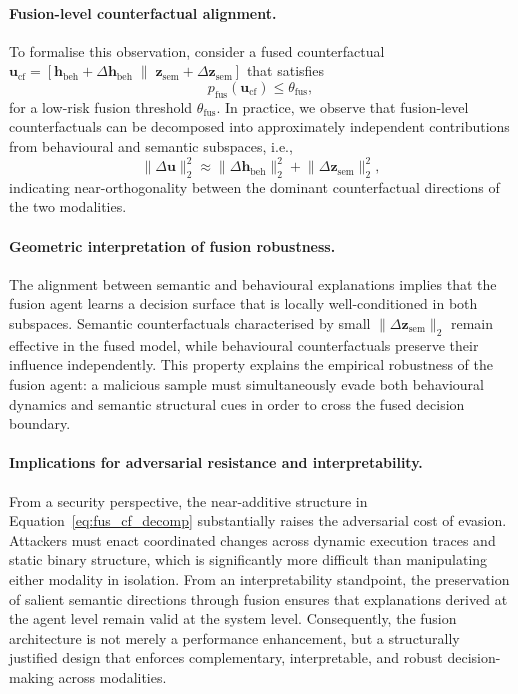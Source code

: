 \documentclass[lettersize,journal]{IEEEtran}
\begin{document}
\paragraph{Fusion-level counterfactual alignment.}
To formalise this observation, consider a fused counterfactual
$\mathbf{u}_{\mathrm{cf}} = [\mathbf{h}_{\mathrm{beh}} + \Delta \mathbf{h}_{\mathrm{beh}}
\;\|\; \mathbf{z}_{\mathrm{sem}} + \Delta \mathbf{z}_{\mathrm{sem}}]$
that satisfies
\begin{equation}
p_{\mathrm{fus}}(\mathbf{u}_{\mathrm{cf}}) \le \theta_{\mathrm{fus}},
\label{eq:fus_cf_condition}
\end{equation}
for a low-risk fusion threshold $\theta_{\mathrm{fus}}$.
In practice, we observe that fusion-level counterfactuals can be decomposed into
approximately independent contributions from behavioural and semantic subspaces, i.e.,
\begin{equation}
\lVert \Delta \mathbf{u} \rVert_2^2
\approx
\lVert \Delta \mathbf{h}_{\mathrm{beh}} \rVert_2^2
+
\lVert \Delta \mathbf{z}_{\mathrm{sem}} \rVert_2^2,
\label{eq:fus_cf_decomp}
\end{equation}
indicating near-orthogonality between the dominant counterfactual directions of the two
modalities.

\vspace{0.3em}
\paragraph{Geometric interpretation of fusion robustness.}
The alignment between semantic and behavioural explanations implies that the fusion agent
learns a decision surface that is locally well-conditioned in both subspaces.
Semantic counterfactuals characterised by small $\lVert \Delta \mathbf{z}_{\mathrm{sem}}
\rVert_2$ remain effective in the fused model, while behavioural counterfactuals preserve
their influence independently.
This property explains the empirical robustness of the fusion agent: a malicious sample
must simultaneously evade both behavioural dynamics and semantic structural cues in order
to cross the fused decision boundary.

\vspace{0.3em}
\paragraph{Implications for adversarial resistance and interpretability.}
From a security perspective, the near-additive structure in
Equation~\eqref{eq:fus_cf_decomp} substantially raises the adversarial cost of evasion.
Attackers must enact coordinated changes across dynamic execution traces and static
binary structure, which is significantly more difficult than manipulating either modality
in isolation.
From an interpretability standpoint, the preservation of salient semantic directions
through fusion ensures that explanations derived at the agent level remain valid at the
system level.
Consequently, the fusion architecture is not merely a performance enhancement, but a
structurally justified design that enforces complementary, interpretable, and robust
decision-making across modalities.
\end{document}
